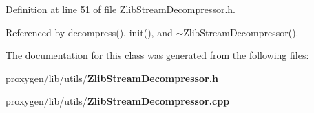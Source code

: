 Definition at line 51 of file Zlib\+Stream\+Decompressor.\+h.



Referenced by decompress(), init(), and $\sim$\+Zlib\+Stream\+Decompressor().



The documentation for this class was generated from the following files\+:\begin{DoxyCompactItemize}
\item 
proxygen/lib/utils/{\bf Zlib\+Stream\+Decompressor.\+h}\item 
proxygen/lib/utils/{\bf Zlib\+Stream\+Decompressor.\+cpp}\end{DoxyCompactItemize}

